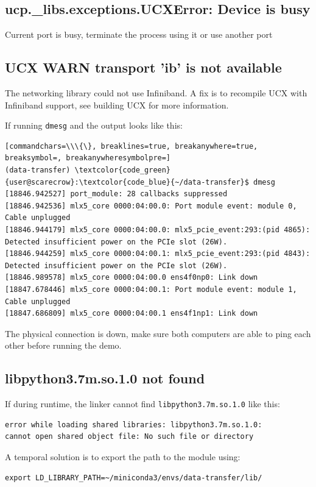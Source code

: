 \documentclass[a4paper,onecolumn]{article}
\begin{document}
\subsection{ucp.\_libs.exceptions.UCXError: Device is busy}

Current port is busy, terminate the process using it or use another port

\subsection{UCX  WARN  transport 'ib' is not available}

The networking library could not use Infiniband. A fix is to recompile UCX with Infiniband support, see building UCX for more information. 

If running \verb|dmesg| and the output looks like this:

\begin{Verbatim}[commandchars=\\\{\}, breaklines=true, breakanywhere=true, breaksymbol=, breakanywheresymbolpre=]
(data-transfer) \textcolor{code_green}{user@scarecrow}:\textcolor{code_blue}{~/data-transfer}$ dmesg
[18846.942527] port_module: 28 callbacks suppressed
[18846.942536] mlx5_core 0000:04:00.0: Port module event: module 0, Cable unplugged
[18846.944179] mlx5_core 0000:04:00.0: mlx5_pcie_event:293:(pid 4865): Detected insufficient power on the PCIe slot (26W).
[18846.944259] mlx5_core 0000:04:00.1: mlx5_pcie_event:293:(pid 4843): Detected insufficient power on the PCIe slot (26W).
[18846.989578] mlx5_core 0000:04:00.0 ens4f0np0: Link down
[18847.678446] mlx5_core 0000:04:00.1: Port module event: module 1, Cable unplugged
[18847.686809] mlx5_core 0000:04:00.1 ens4f1np1: Link down
\end{Verbatim}

The physical connection is down, make sure both computers are able to ping each other before running the demo.


\subsection{libpython3.7m.so.1.0 not found}
If during runtime, the linker cannot find \verb|libpython3.7m.so.1.0| like this:
\begin{verbatim}
error while loading shared libraries: libpython3.7m.so.1.0: 
cannot open shared object file: No such file or directory
\end{verbatim}

A temporal solution is to export the path to the module using:
\begin{verbatim}
export LD_LIBRARY_PATH=~/miniconda3/envs/data-transfer/lib/
\end{verbatim}
\end{document}
